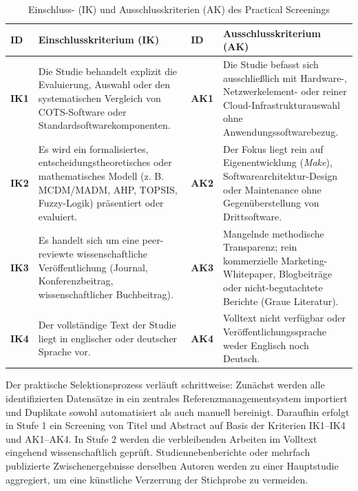\begin{table}[htbp]
\centering
\small
\caption{Einschluss- (IK) und Ausschlusskriterien (AK) des Practical Screenings}
\label{tab:einschluss_ausschluss}
\begin{tabularx}{\textwidth}{p{0.8cm} X p{0.8cm} X}
\toprule
\textbf{ID} & \textbf{Einschlusskriterium (IK)} & \textbf{ID} & \textbf{Ausschlusskriterium (AK)} \\
\midrule
\textbf{IK1} & Die Studie behandelt explizit die Evaluierung, Auswahl oder den systematischen Vergleich von COTS-Software oder Standardsoftwarekomponenten. & \textbf{AK1} & Die Studie befasst sich ausschließlich mit Hardware-, Netzwerkelement- oder reiner Cloud-Infrastrukturauswahl ohne Anwendungssoftwarebezug. \\
\midrule
\textbf{IK2} & Es wird ein formalisiertes, entscheidungstheoretisches oder mathematisches Modell (z. B. MCDM/MADM, AHP, TOPSIS, Fuzzy-Logik) präsentiert oder evaluiert. & \textbf{AK2} & Der Fokus liegt rein auf Eigenentwicklung (\textit{Make}), Softwarearchitektur-Design oder Maintenance ohne Gegenüberstellung von Drittsoftware. \\
\midrule
\textbf{IK3} & Es handelt sich um eine peer-reviewte wissenschaftliche Veröffentlichung (Journal, Konferenzbeitrag, wissenschaftlicher Buchbeitrag). & \textbf{AK3} & Mangelnde methodische Transparenz; rein kommerzielle Marketing-Whitepaper, Blogbeiträge oder nicht-begutachtete Berichte (Graue Literatur). \\
\midrule
\textbf{IK4} & Der vollständige Text der Studie liegt in englischer oder deutscher Sprache vor. & \textbf{AK4} & Volltext nicht verfügbar oder Veröffentlichungssprache weder Englisch noch Deutsch. \\
\bottomrule
\end{tabularx}
\end{table}

Der praktische Selektionsprozess verläuft schrittweise: Zunächst werden alle identifizierten Datensätze in ein zentrales Referenzmanagementsystem importiert und Duplikate sowohl automatisiert als auch manuell bereinigt. Daraufhin erfolgt in Stufe 1 ein Screening von Titel und Abstract auf Basis der Kriterien IK1--IK4 und AK1--AK4. In Stufe 2 werden die verbleibenden Arbeiten im Volltext eingehend wissenschaftlich geprüft. Studiennebenberichte oder mehrfach publizierte Zwischenergebnisse derselben Autoren werden zu einer Hauptstudie aggregiert, um eine künstliche Verzerrung der Stichprobe zu vermeiden.

